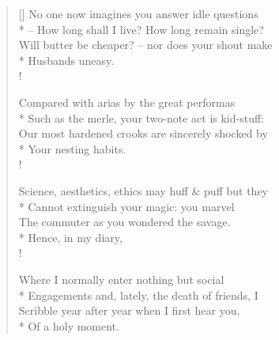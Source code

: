 \documentclass[MAIN]{subfiles}
\begin{document}
\settowidth{\versewidth}{No one now imagines you answer idle questions}
\begin{verse}[\versewidth]
No one now imagines you answer idle questions\\*
-- How long shall I live? How long remain single?\\
Will butter be cheaper? -- nor does your shout make\\*
\vin Husbands uneasy.\\!

Compared with arias by the great performas\\*
Such as the merle, your two-note act is kid-stuff:\\
Our most hardened crooks are sincerely shocked by\\*
\vin Your nesting habits.\\!

Science, aesthetics, ethics may huff \& puff but they\\*
Cannot extinguish your magic: you marvel\\
The commuter as you wondered the savage.\\*
\vin Hence, in my diary,\\!

Where I normally enter nothing but social\\*
Engagements and, lately, the death of friends, I\\
Scribble year after year when I first hear you,\\*
\vin Of a holy moment.
\end{verse}
\end{document}
